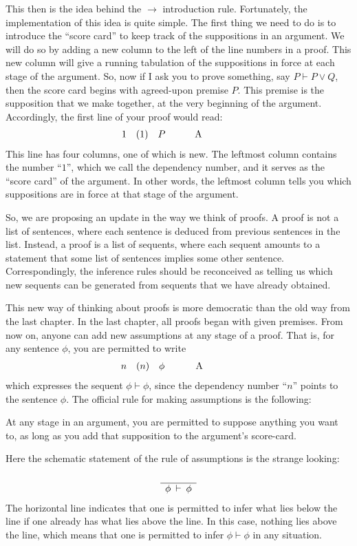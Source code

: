 This then is the idea behind the $\to$ introduction rule.
Fortunately, the implementation of this idea is quite simple.  The
first thing we need to do is to introduce the ``score card'' to keep
track of the suppositions in an argument.  We will do so by adding a
new column to the left of the line numbers in a proof.  This new
column will give a running tabulation of the suppositions in force at
each stage of the argument.  So, now if I ask you to prove something,
say $P\vdash P\vee Q$, then the score card begins with agreed-upon
premise $P$.  This premise is the supposition that we make together,
at the very beginning of the argument.  Accordingly, the first line of
your proof would read:
\[ \begin{array}{l l
      >{$}p{1cm}<{$} p{1.5cm} l } 1 & (1) & P & A \end{array} \] This
line has four columns, one of which is new.  The leftmost column
contains the number ``$1$'', which we call the \gls{dependency
  number}, and it serves as the ``score card'' of the argument.  In
other words, the leftmost column tells you which suppositions are in
force at that stage of the argument. 

So, we are proposing an update in the way we think of proofs.  A proof
is not a list of sentences, where each sentence is deduced from
previous sentences in the list.  Instead, a proof is a list of
\glspl{sequent}, where each sequent amounts to a statement that some
list of sentences implies some other sentence.  Correspondingly, the
inference rules should be reconceived as telling us which new sequents
can be generated from sequents that we have already obtained.

This new way of thinking about proofs is more democratic than the old
way from the last chapter.  In the last chapter, all proofs began with
given premises.  From now on, anyone can add new assumptions at any
stage of a proof.  That is, for any sentence $\phi$, you are permitted
to write
\[ \begin{array}{l l
      >{$}p{1cm}<{$} p{1.5cm} l } n & (n) & \phi & A \end{array} \]
which expresses the sequent $\phi\vdash\phi$, since the dependency
number ``$n$'' points to the sentence $\phi$.  The official rule for
making assumptions is the following: \bigskip
\begin{tcolorbox}[enhanced,width=9.7cm,title=rule of assumptions (A),attach boxed title to top
  left={yshift=-2mm,xshift=4mm},boxed title style={sharp corners}] 
At any stage in an argument, you are permitted to suppose anything you want to, as long as you add
  that supposition to the argument's score-card.  
\end{tcolorbox} \bigskip
Here the schematic statement of the rule of assumptions is the strange
looking:
\[ \begin{array}{c c}
       \mbox{} \\ \hline
     \phi\:\vdash\: \phi \end{array} \]
The horizontal line indicates that one is permitted to infer what lies
below the line if one already has what lies above the line.  In this
case, nothing lies above the line, which means that one is permitted
to infer $\phi\vdash\phi$ in any situation.

